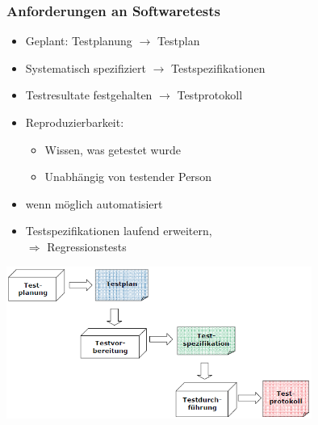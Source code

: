 \begin{multicols}{2}
\subsubsection{Anforderungen an Softwaretests}
	\begin{minipage}{12cm}
	\begin{itemize}
			\item Geplant: Testplanung $\rightarrow$ Testplan
			\item Systematisch spezifiziert $\rightarrow$ Testspezifikationen
			\item Testresultate festgehalten $\rightarrow$ Testprotokoll
			\item Reproduzierbarkeit:
			\begin{itemize}
				\item Wissen, was getestet wurde
				\item Unabhängig von testender Person
			\end{itemize}
			\item wenn möglich automatisiert
			\item Testspezifikationen laufend erweitern,\\
			$\Rightarrow$ Regressionstests
		\end{itemize}
	\end{minipage}
		\begin{minipage}{10cm}
			\includegraphics[width=10cm]{images/sofwaretest.png}
		\end{minipage}
\end{multicols}

